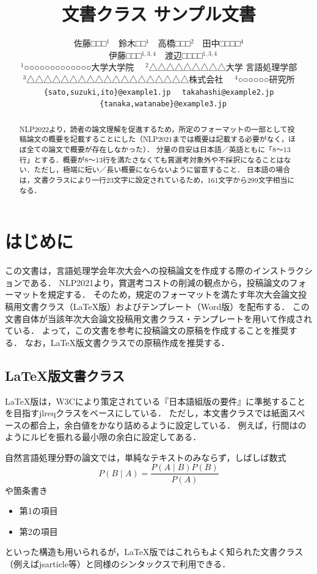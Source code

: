 \documentclass[
  platex, dvipdfmx,  %
]{nlp2026}
\title{\pkg{NLP2026}文書クラス サンプル文書}
\author{%
  佐藤□□□${}^{1}$　鈴木□□${}^{1}$　高橋□□□${}^{2}$　田中□□□□${}^{4}$\\
　伊藤□□□${}^{1,3,4}$　渡辺□□□□${}^{1,3,4}$\\
${}^{1}$○○○○○○○○○○○○○大学大学院
　${}^{2}$△△△△△△△△△大学 言語処理学部\\
${}^{3}$△△△△△△△△△△△△△△△△△△△株式会社 　${}^{4}$○○○○○○研究所\\ \texttt{\{sato,suzuki,ito\}@example1.jp}
　\texttt{takahashi@example2.jp}\\
　\texttt{\{tanaka,watanabe\}@example3.jp}}
\newcommand{\pkg}[1]{\textsf{#1}}
\begin{document}
\maketitle
\begin{abstract}
NLP2022より，読者の論文理解を促進するため，所定のフォーマットの一部として投稿論文の概要を記載することにした（NLP2021までは概要は記載する必要がなく，ほぼ全ての論文で概要が存在しなかった）．
分量の目安は日本語／英語ともに「8〜13行」とする．概要が8〜13行を満たさなくても賞選考対象外や不採択になることはない．ただし，極端に短い／長い概要にならないように留意すること．
日本語の場合は，文書クラスにより一行23文字に設定されているため，161文字から299文字相当になる．
\end{abstract}

\section{はじめに}
この文書は，言語処理学会年次大会への投稿論文を作成する際のインストラクションである．
NLP2021より，賞選考コストの削減の観点から，投稿論文のフォーマットを規定する．
そのため，規定のフォーマットを満たす年次大会論文投稿用文書クラス（LaTeX版）およびテンプレート（Word版）を配布する．
この文書自体が当該年次大会論文投稿用文書クラス・テンプレートを用いて作成されている．
よって，この文書を参考に投稿論文の原稿を作成することを推奨する．
なお，LaTeX版文書クラスでの原稿作成を推奨する．

\subsection{LaTeX版文書クラス}
LaTeX版は，W3Cにより策定されている『日本語組版の要件』\cite{JLREQ}に準拠することを目指す\pkg{jlreq}クラスをベースにしている．
ただし，本文書クラスでは紙面スペースの都合上，余白値をかなり詰めるように設定している．
例えば，行間はのようにルビを振れる最小限の余白に設定してある．

自然言語処理分野の論文では，単純なテキストのみならず，しばしば数式
%
\begin{equation}
P(B\mid A) = \frac{P(A\mid B)P(B)}{P(A)}
\end{equation}
%
や箇条書き
%
\begin{itemize}
\item 第1の項目
\item 第2の項目
\end{itemize}
%
といった構造も用いられるが，LaTeX版ではこれらもよく知られた文書クラス（例えば\pkg{jsarticle}等）と同様のシンタックスで利用できる．
\end{document}

